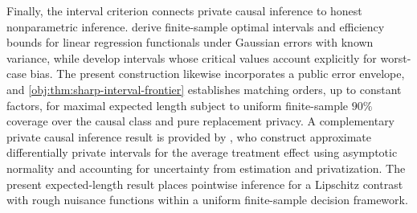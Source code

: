 Finally, the interval criterion connects private causal inference to honest nonparametric inference. \citet{ArmstrongKolesar2018} derive finite-sample optimal intervals and efficiency bounds for linear regression functionals under Gaussian errors with known variance, while \citet{ArmstrongKolesar2020} develop intervals whose critical values account explicitly for worst-case bias. The present construction likewise incorporates a public error envelope, and \cref{obj:thm:sharp-interval-frontier} establishes matching orders, up to constant factors, for maximal expected length subject to uniform finite-sample \(90\%\) coverage over the causal class and pure replacement privacy. A complementary private causal inference result is provided by \citet[][Sections 4.2--4.3]{SchroderHartensteinFeuerriegel2025}, who construct approximate differentially private intervals for the average treatment effect using asymptotic normality and accounting for uncertainty from estimation and privatization. The present expected-length result places pointwise inference for a Lipschitz contrast with rough nuisance functions within a uniform finite-sample decision framework.
